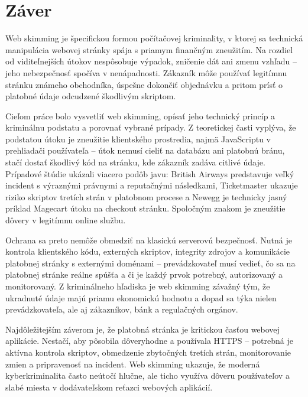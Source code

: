 \section{Záver}

Web skimming je špecifickou formou počítačovej kriminality, v ktorej sa technická manipulácia webovej stránky spája s priamym finančným zneužitím. Na rozdiel od viditeľnejších útokov nespôsobuje výpadok, zničenie dát ani zmenu vzhľadu -- jeho nebezpečnosť spočíva v nenápadnosti. Zákazník môže používať legitímnu stránku známeho obchodníka, úspešne dokončiť objednávku a pritom prísť o platobné údaje odcudzené škodlivým skriptom.

Cieľom práce bolo vysvetliť web skimming, opísať jeho technický princíp a kriminálnu podstatu a porovnať vybrané prípady. Z teoretickej časti vyplýva, že podstatou útoku je zneužitie klientského prostredia, najmä JavaScriptu v prehliadači používateľa -- útok nemusí cieliť na databázu ani platobnú bránu, stačí dostať škodlivý kód na stránku, kde zákazník zadáva citlivé údaje. Prípadové štúdie ukázali viacero podôb javu: British Airways predstavuje veľký incident s výraznými právnymi a reputačnými následkami, Ticketmaster ukazuje riziko skriptov tretích strán v platobnom procese a Newegg je technicky jasný príklad Magecart útoku na checkout stránku. Spoločným znakom je zneužitie dôvery v legitímnu online službu.

Ochrana sa preto nemôže obmedziť na klasickú serverovú bezpečnosť. Nutná je kontrola klientského kódu, externých skriptov, integrity zdrojov a komunikácie platobnej stránky s externými doménami -- prevádzkovateľ musí vedieť, čo sa na platobnej stránke reálne spúšťa a či je každý prvok potrebný, autorizovaný a monitorovaný. Z kriminálneho hľadiska je web skimming závažný tým, že ukradnuté údaje majú priamu ekonomickú hodnotu a dopad sa týka nielen prevádzkovateľa, ale aj zákazníkov, bánk a regulačných orgánov.

Najdôležitejším záverom je, že platobná stránka je kritickou časťou webovej aplikácie. Nestačí, aby pôsobila dôveryhodne a používala HTTPS -- potrebná je aktívna kontrola skriptov, obmedzenie zbytočných tretích strán, monitorovanie zmien a pripravenosť na incident. Web skimming ukazuje, že moderná kyberkriminalita často neútočí hlučne, ale ticho využíva dôveru používateľov a slabé miesta v dodávateľskom reťazci webových aplikácií.
